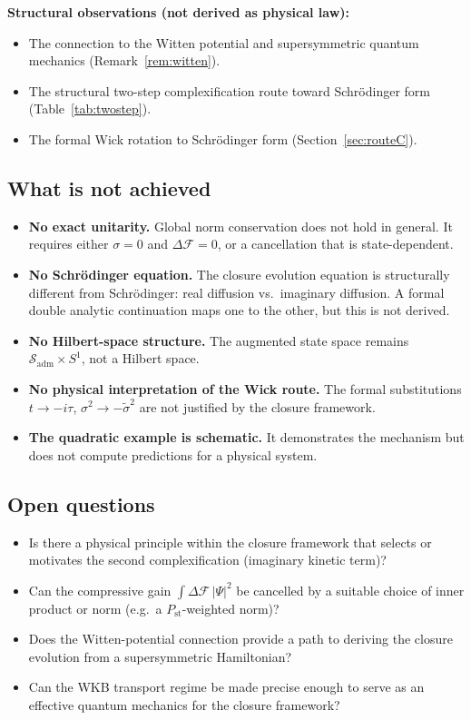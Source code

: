 \documentclass[12pt]{article}
\newcommand{\Fcal}{\mathcal{F}}
\newcommand{\Sadm}{\mathcal{S}_{\mathrm{adm}}}
\begin{document}
\textbf{Structural observations (not derived as physical law):}
\begin{itemize}
    \item The connection to the Witten potential and supersymmetric quantum mechanics (Remark~\ref{rem:witten}).
    \item The structural two-step complexification route toward Schr\"odinger form (Table~\ref{tab:twostep}).
    \item The formal Wick rotation to Schr\"odinger form (Section~\ref{sec:routeC}).
\end{itemize}

\subsection{What is not achieved}

\begin{itemize}
    \item \textbf{No exact unitarity.} Global norm conservation does not hold in general. It requires either $\sigma = 0$ and $\Delta\Fcal = 0$, or a cancellation that is state-dependent.
    \item \textbf{No Schr\"odinger equation.} The closure evolution equation is structurally different from Schr\"odinger: real diffusion vs.\ imaginary diffusion. A formal double analytic continuation maps one to the other, but this is not derived.
    \item \textbf{No Hilbert-space structure.} The augmented state space remains $\Sadm \times S^1$, not a Hilbert space.
    \item \textbf{No physical interpretation of the Wick route.} The formal substitutions $t \to -i\tau$, $\sigma^2 \to -\tilde{\sigma}^2$ are not justified by the closure framework.
    \item \textbf{The quadratic example is schematic.} It demonstrates the mechanism but does not compute predictions for a physical system.
\end{itemize}

\subsection{Open questions}

\begin{itemize}
    \item Is there a physical principle within the closure framework that selects or motivates the second complexification (imaginary kinetic term)?
    \item Can the compressive gain $\int \Delta\Fcal\,|\Psi|^2$ be cancelled by a suitable choice of inner product or norm (e.g.\ a $P_{\mathrm{st}}$-weighted norm)?
    \item Does the Witten-potential connection provide a path to deriving the closure evolution from a supersymmetric Hamiltonian?
    \item Can the WKB transport regime be made precise enough to serve as an effective quantum mechanics for the closure framework?
\end{itemize}
\end{document}
